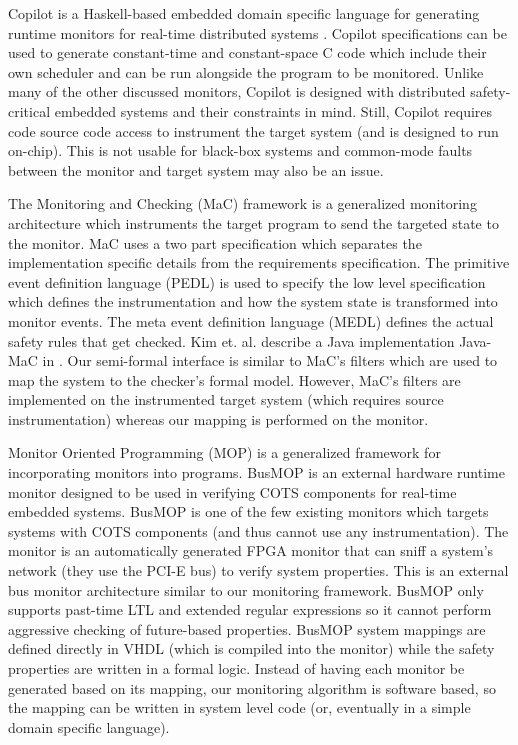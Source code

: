 \documentclass[]{../llncs/llncs}
\begin{document}


Copilot is a Haskell-based embedded domain specific language for generating runtime monitors for real-time distributed systems \cite{Pike2010}. 
Copilot specifications can be used to generate constant-time and constant-space C code which include their own scheduler and can be run alongside the program to be monitored.
Unlike many of the other discussed monitors, Copilot is designed with distributed safety-critical embedded systems and their constraints in mind. 
Still, Copilot requires code source code access to instrument the target system (and is designed to run on-chip). This is not usable for black-box systems and common-mode faults between the monitor and target system may also be an issue.

The Monitoring and Checking (MaC) framework \cite{Lee1999} is a generalized monitoring architecture which instruments the target program to send the targeted state to the monitor. MaC uses a two part specification which separates the implementation specific details from the requirements specification. 
The primitive event definition language (PEDL) is used to specify the low level specification which defines the instrumentation and how the system state is transformed into monitor events. The meta event definition language (MEDL) defines the actual safety rules that get checked. Kim et. al. describe a Java implementation Java-MaC in \cite{Kim2004}.
Our semi-formal interface is similar to MaC's filters which are used to map the system to the checker's formal model. However, MaC's filters are implemented on the instrumented target system (which requires source instrumentation) whereas our mapping is performed on the monitor.

Monitor Oriented Programming (MOP) is a generalized framework for incorporating monitors into programs.
BusMOP \cite{Pellizzoni2008} is an external hardware runtime monitor designed to be used in verifying COTS components for real-time embedded systems. BusMOP is one of the few existing monitors which targets systems with COTS components (and thus cannot use any instrumentation). The monitor is an automatically generated FPGA monitor that can sniff a system's network (they use the PCI-E bus) to verify system properties.
This is an external bus monitor architecture similar to our monitoring framework.
BusMOP only supports past-time LTL and extended regular expressions so it cannot perform aggressive checking of future-based properties. BusMOP system mappings are defined directly in VHDL (which is compiled into the monitor) while the safety properties are written in a formal logic. Instead of having each monitor be generated based on its mapping, our monitoring algorithm is software based, so the mapping can be written in system level code (or, eventually in a simple domain specific language).
\end{document}
